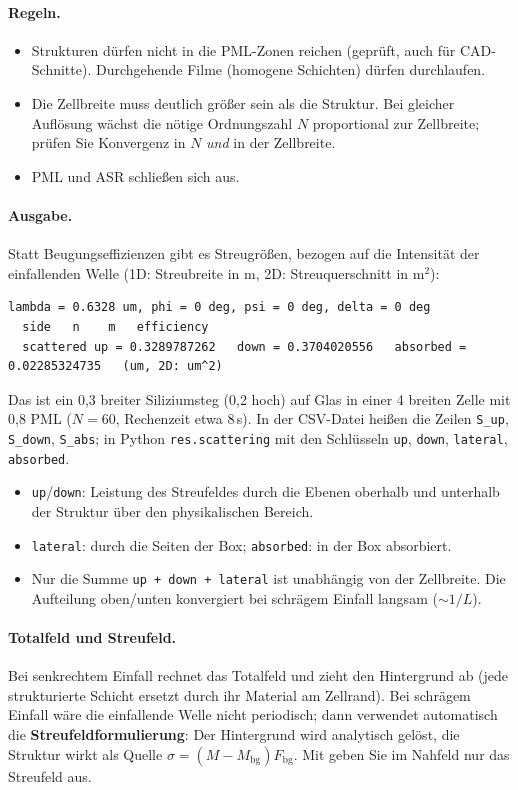 \paragraph{Regeln.}
\begin{itemize}
  \item Strukturen dürfen nicht in die PML-Zonen reichen (geprüft, auch für CAD-Schnitte). Durchgehende Filme
        (homogene Schichten) dürfen durchlaufen.
  \item Die Zellbreite muss deutlich größer sein als die Struktur. Bei gleicher Auflösung wächst die nötige
        Ordnungszahl $N$ proportional zur Zellbreite; prüfen Sie Konvergenz in $N$ \emph{und} in der Zellbreite.
  \item PML und ASR schließen sich aus.
\end{itemize}

\paragraph{Ausgabe.} Statt Beugungseffizienzen gibt es Streugrößen, bezogen auf die Intensität der einfallenden
Welle (1D: Streubreite in \textmu m, 2D: Streuquerschnitt in \textmu m$^2$):
\begin{lstlisting}
lambda = 0.6328 um, phi = 0 deg, psi = 0 deg, delta = 0 deg
  side   n    m   efficiency
  scattered up = 0.3289787262   down = 0.3704020556   absorbed = 0.02285324735   (um, 2D: um^2)
\end{lstlisting}
Das ist ein 0,3\um{} breiter Siliziumsteg (0,2\um{} hoch) auf Glas in einer 4\um{} breiten Zelle mit 0,8\um{} PML
($N=60$, Rechenzeit etwa 8\,s). In der CSV-Datei heißen die Zeilen \texttt{S\_up}, \texttt{S\_down},
\texttt{S\_abs}; in Python \texttt{res.scattering} mit den Schlüsseln \texttt{up}, \texttt{down}, \texttt{lateral},
\texttt{absorbed}.
\begin{itemize}
  \item \texttt{up}/\texttt{down}: Leistung des Streufeldes durch die Ebenen oberhalb und unterhalb der Struktur über
        den physikalischen Bereich.
  \item \texttt{lateral}: durch die Seiten der Box; \texttt{absorbed}: in der Box absorbiert.
  \item Nur die Summe \texttt{up + down + lateral} ist unabhängig von der Zellbreite. Die Aufteilung oben/unten
        konvergiert bei schrägem Einfall langsam ($\sim1/L$).
\end{itemize}

\paragraph{Totalfeld und Streufeld.} Bei senkrechtem Einfall rechnet \FG{} das Totalfeld und zieht den
Hintergrund ab (jede strukturierte Schicht ersetzt durch ihr Material am Zellrand). Bei schrägem Einfall wäre die
einfallende Welle nicht periodisch; dann verwendet \FG{} automatisch die \textbf{Streufeldformulierung}: Der
Hintergrund wird analytisch gelöst, die Struktur wirkt als Quelle $\sigma=(M-M_{\text{bg}})F_{\text{bg}}$. Mit
 geben Sie im Nahfeld nur das Streufeld aus.

